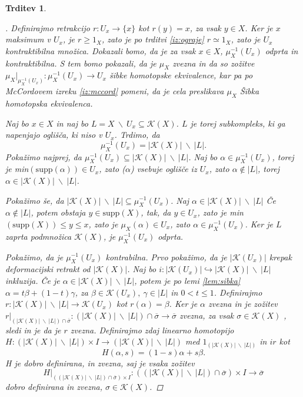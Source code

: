\documentclass[a4paper,12pt]{article}
\DeclareRobustCommand{\k}{
    \mathcal{K}
}
\theoremstyle{definition}
\theoremstyle{plain}
\theoremstyle{definition}
\theoremstyle{plain}
\newtheorem{trditev}{Trditev}
\theoremstyle{plain}
\theoremstyle{plain}
\theoremstyle{plain}
\newenvironment{dokaz}{\begin{proof}[\bfseries\upshape\proofname]}{\end{proof}}
\begin{document}
\begin{trditev}
\begin{dokaz}
    Definirajmo retrakcijo $r:U_x\rightarrow \{x\}$ kot 
    $r(y)=x$, za vsak $y\in X$. Ker je $x$ maksimum v 
    $U_x$, je $r\geq 1_X$, zato je po trditvi 
    \ref{iz:ograje} $r\simeq 1_X$, zato je $U_x$ 
    kontraktibilna množica. Dokazali bomo, da je za vsak 
    $x\in X$, $\mu_X^{-1}(U_x)$ odprta in kontraktibilna. S 
    tem bomo pokazali, da je $\mu_X$ zvezna in da so 
    zožitve $\mu_X|_{\mu_X^{-1}(U_x)}:\mu_X^{-1}(U_x)\rightarrow 
    U_x$ šibke homotopske ekvivalence, kar pa po McCordovem izreku \ref*{iz:mccord}
    pomeni, da je cela preslikava $\mu_X$ Šibka homotopska ekvivalenca.

    Naj bo $x\in X$ in naj bo $L=X\ \backslash \
    U_x\subseteq \mathcal{K}(X)$. $L$ je torej 
    subkompleks, ki ga napenjajo oglišča, ki niso v $U_x$. 
    Trdimo, da 
    $$
    \mu_X^{-1}(U_x)=|\mathcal{K}(X)|\ \backslash \ |L|.
    $$
    Pokažimo najprej, da $\mu_X^{-1}(U_x)\subseteq 
    |\mathcal{K}(X)|\ \backslash \ |L|$. Naj bo $\alpha \in 
    \mu_X^{-1}(U_x)$, torej je min$(
    (\alpha))\in U_x$, zato \text{supp}($\alpha$) vsebuje 
    oglišče iz $U_x$, zato $\alpha \notin |L|$, torej $\alpha 
    \in |\mathcal{K}(X)|\ \backslash \ |L|$.

    Pokažimo še, da $|\mathcal{K}(X)|\ \backslash \
    |L|\subseteq \mu_X^{-1}(U_x)$. Naj $\alpha \in |\mathcal{K}(X)|\ \backslash \ |L|$
    Če  $\alpha \notin |L|$, potem obstaja $y\in 
    \text{supp}(X)$, tak, da $y \in U_x$, zato je 
    min$(\text{supp}(X))\leq y \leq x$, zato je 
    $\mu_X(\alpha) \in U_x$, zato $\alpha \in \mu_X^{-1}
    (U_x)$.
    Ker je $L$ zaprta podmnožica $\mathcal{K}(X)$, je 
    $\mu_X^{-1}(U_x)$ odprta.

    Pokažimo, da je $\mu_X^{-1}(U_x)$ kontrabilna. Prvo pokažimo, da je 
    $|\mathcal{K}(U_x)|$ krepak deformacijski retrakt 
    od $|\mathcal{K}(X)|$. Naj bo $i:|\k(U_x)|\hookrightarrow |\mathcal{K}
    (X)|\ \backslash \ |L|$ inkluzija. Če je $\alpha \in |\mathcal{K}(X)|\ 
    \backslash \ |L|$, potem je po lemi \ref{lem:sibka}  $\alpha = t\beta + 
    (1-t)\gamma$, za $\beta \in \k(U_x), \ \gamma \in |L|$ in $0<t\leq 1$. 
    Definirajmo $r:|\mathcal{K}(X)|\ \backslash \ |L|\rightarrow \k(U_x)$ 
    kot $r(\alpha)=\beta$. Ker je $\alpha$ zvezna in je zožitev $r|_{(|\mathcal{K}(X)|\ \backslash \ |L|)\cap 
    \overline{\sigma}}:(|\mathcal{K}(X)|\ \backslash \ |L|)\cap 
    \overline{\sigma} \rightarrow \overline{\sigma}$ zvezna, za vsak 
    $\sigma \in \k(X)$ , sledi in je da je $r$ zvezna. Definirajmo zdaj linearno homotopijo $H:(|\mathcal{K}(X)|\ \backslash \ |L|) \times I \rightarrow (|\mathcal{K}(X)|\ \backslash \ |L|)$ med $1_{(|\mathcal{K}(X)|\ \backslash \ |L|)}$ in $ir$ kot 
    $$
    H(\alpha,s)=(1-s)\alpha + s\beta.
    $$
    H je dobro definirana, in zvezna, saj je vsaka zožitev 
    $$
    H|_{((|\mathcal{K}(X)|\ \backslash \ |L|)\cap 
    \overline{\sigma})\times I}:((|\mathcal{K}(X)|\ \backslash \ |L|)\cap 
    \overline{\sigma})\times I \rightarrow \overline{\sigma}
    $$
    dobro definirana in zvezna, $\sigma \in \k(X)$.


\end{dokaz}
\end{trditev}
\end{document}
